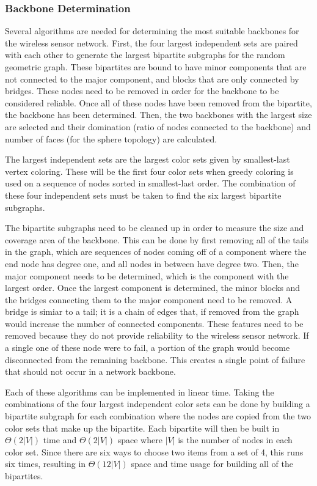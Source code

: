 \documentclass{article}
\begin{document}
        \subsubsection{Backbone Determination}
        Several algorithms are needed for determining the most suitable backbones for the wireless sensor network. First, the four largest independent sets are paired with each other to generate the largest bipartite subgraphs for the random geometric graph. These bipartites are bound to have minor components that are not connected to the major component, and blocks that are only connected by bridges. These nodes need to be removed in order for the backbone to be considered reliable. Once all of these nodes have been removed from the bipartite, the backbone has been determined. Then, the two backbones with the largest size are selected and their domination (ratio of nodes connected to the backbone) and number of faces (for the sphere topology) are calculated.
        \par
        The largest independent sets are the largest color sets given by smallest-last vertex coloring. These will be the first four color sets when greedy coloring is used on a sequence of nodes sorted in smallest-last order. The combination of these four independent sets must be taken to find the six largest bipartite subgraphs.
        \par
        The bipartite subgraphs need to be cleaned up in order to measure the size and coverage area of the backbone. This can be done by first removing all of the tails in the graph, which are sequences of nodes coming off of a component where the end node has degree one, and all nodes in between have degree two. Then, the major component needs to be determined, which is the component with the largest order. Once the largest component is determined, the minor blocks and the bridges connecting them to the major component need to be removed. A bridge is simiar to a tail; it is a chain of edges that, if removed from the graph would increase the number of connected components. These features need to be removed because they do not provide reliability to the wireless sensor network. If a single one of these node were to fail, a portion of the graph would become disconnected from the remaining backbone. This creates a single point of failure that should not occur in a network backbone.
        \par
        Each of these algorithms can be implemented in linear time. Taking the combinations of the four largest independent color sets can be done by building a bipartite subgraph for each combination where the nodes are copied from the two color sets that make up the bipartite. Each bipartite will then be built in $\Theta(2|V|)$ time and $\Theta(2|V|)$ space where $|V|$ is the number of nodes in each color set. Since there are six ways to choose two items from a set of 4, this runs six times, resulting in $\Theta(12|V|)$ space and time usage for building all of the bipartites.
\end{document}
